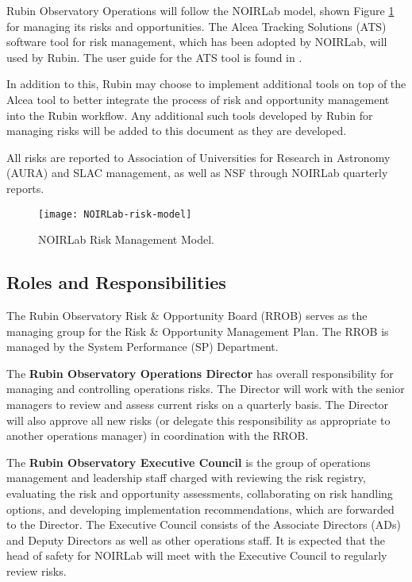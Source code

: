 Rubin Observatory Operations will follow the NOIRLab model, shown Figure \ref{fig:NOIRLab-risk-model} for managing its risks and opportunities. 
The Alcea Tracking Solutions (ATS) software tool \citep{ATS-cite} for risk management, which has been adopted by NOIRLab, will used by Rubin.
The user guide for the ATS tool is found in .

In addition to this, Rubin may choose to implement additional tools on top of the Alcea tool to better integrate the process of risk and opportunity management into the Rubin workflow. 
Any additional such tools developed by Rubin for managing risks will be added to this document as they are developed. 
 
All risks are reported to Association of Universities for Research in Astronomy (AURA) and SLAC management, as well as NSF through NOIRLab quarterly reports.

\begin{figure}[htp!]
\caption{NOIRLab Risk Management Model.}
\centering
\texttt{[image: NOIRLab-risk-model]}
\label{fig:NOIRLab-risk-model}
\end{figure}


\subsection{Roles and Responsibilities}

The Rubin Observatory Risk \& Opportunity Board (RROB) serves as the managing group for the Risk \& Opportunity Management Plan.
The RROB is managed by the System Performance (SP) Department.

The \textbf{Rubin Observatory Operations Director} has overall responsibility for managing and controlling operations risks.
The Director will work with the senior managers to review and assess current risks on a quarterly basis.
The Director will also approve all new risks (or delegate this responsibility as appropriate to another operations manager) in coordination with the RROB.

The \textbf{Rubin Observatory Executive Council} is the group of operations management and leadership staff charged with reviewing the risk registry, evaluating the risk and opportunity assessments, collaborating on risk handling options, and developing implementation recommendations, which are forwarded to the Director.
The Executive Council consists of the Associate Directors (ADs) and Deputy Directors as well as other operations staff.
It is expected that the head of safety for NOIRLab will meet with the Executive Council to regularly review risks.
